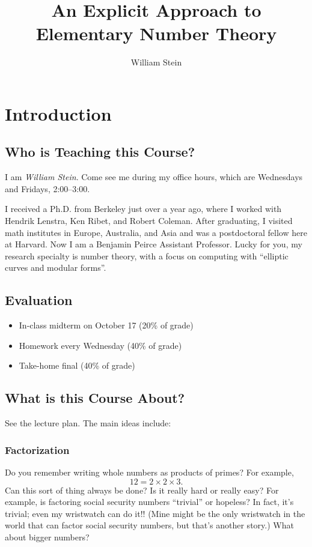 \documentclass[11pt]{report}
\title{An Explicit Approach to Elementary Number Theory}
\author{William Stein}
\begin{document}
\maketitle
\tableofcontents

\chapter{Introduction}
\section{Who is Teaching this Course?}
I am {\em William Stein}.  Come see me during my office hours, which
are Wednesdays and Fridays, 2:00--3:00.

 I received a Ph.D. from Berkeley just over a year ago,
where I worked with Hendrik Lenstra, Ken Ribet, and Robert Coleman.
After graduating, I visited math institutes in Europe, Australia, and
Asia and was a postdoctoral fellow here at Harvard.  Now I am a
Benjamin Peirce Assistant Professor.  Lucky for you, my research
specialty is number theory, with a focus on computing with ``elliptic
curves and modular forms''.

\section{Evaluation}
\begin{itemize}
  \item In-class midterm on October 17  (20\% of grade)
  \item Homework every Wednesday (40\% of grade)
  \item Take-home final (40\% of grade)
\end{itemize}


\section{What is this Course About?}
See the lecture plan.  The main ideas include:

\subsection{Factorization}
Do you remember writing whole numbers as products of primes?
For example,
$$12=2\times 2\times 3.$$
Can this sort of thing always be done?  Is it really hard or really
easy?  For example, is factoring social security numbers ``trivial''
or hopeless?  In fact, it's trivial; even my wristwatch can do it!!
(Mine might be the only wristwatch in the world that can factor social
security numbers, but that's another story.)  What about bigger
numbers?
\end{document}
